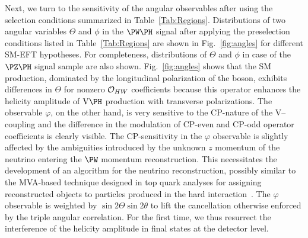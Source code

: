 \documentclass[a4paper,11pt]{article}
\renewcommand{\PV}{{{{V}}}\xspace}
\begin{document}
Next, we turn to the sensitivity of the angular observables after using the selection conditions summarized in Table~\ref{Tab:Regions}. 
Distributions of two angular variables $\Theta$ and $\phi$ in the $\PW\PH$ signal after applying the preselection conditions listed in Table~\ref{Tab:Regions} are shown in Fig.~\ref{fig:angles} for different SM-EFT hypotheses. 
For completeness, distributions of $\Theta$ and $\phi$ in case of the $\PZ\PH$ signal sample are also shown.
Fig.~\ref{fig:angles} shows that
the SM production, dominated by the longitudinal polarization of the \PW boson, exhibits differences in $\Theta$ for nonzero ${\cal O}_{HW}$  coefficients because this operator  enhances the helicity amplitude of $\textrm{\PV}\PH$ production with transverse polarizations.%
The observable $\varphi$, on the other hand, is very sensitive to the CP-nature of the \PV--\PH coupling and the difference in the modulation of CP-even and CP-odd operator coefficients is clearly visible.  
The CP-sensitivity in the $\varphi$ observable is slightly affected by the ambiguities introduced by the unknown $z$ momentum of the neutrino entering the $\PW$ momentum reconstruction. 
This necessitates the development of an algorithm for the neutrino reconstruction, possibly similar to the MVA-based technique designed in top quark analyses for assigning reconstructed objects to particles produced in the hard interaction~\cite{CMS:2019esx}.
The $\varphi$ observable is weighted by $\sin2\Theta\sin2\theta$ to lift the cancellation otherwise enforced by the triple angular correlation. 
For the first time, we thus resurrect the interference of the helicity amplitude in \PH final states at the detector level. 
\end{document}
